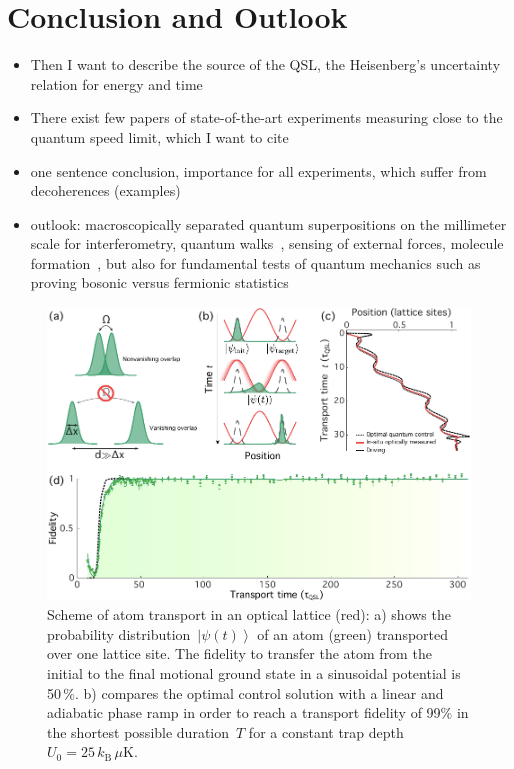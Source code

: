 \documentclass[aps,pra,reprint,a4paper,nofootinbib,superscriptaddress,numbers,longbibliography,showpacs,showkeys,floatfix]{revtex4-1}
\def\ket#1{\left|#1\right\rangle}
\begin{document}
%
%

\section*{Conclusion and Outlook}
\begin{itemize}
     \item Then I want to describe the source of the QSL, the Heisenberg's uncertainty relation for energy and time~\cite{Deffner:2017a, Anandan:1990} %
    \item There exist few papers of state-of-the-art experiments measuring close to the quantum speed limit, which I want to cite~\cite{Frank:2016, Bason:2012}
    \item one sentence conclusion, importance for all experiments, which suffer from decoherences (examples)
    \item outlook: macroscopically separated quantum superpositions on the millimeter scale for interferometry, quantum walks~\cite{Groh:2016}, sensing of external forces, molecule formation~\cite{Liu:2018}, but also for fundamental tests of quantum mechanics such as proving bosonic versus fermionic statistics~\cite{Roos:2017}
\end{itemize}

\begin{figure}
	\centering
	\includegraphics[width=\textwidth]{figure1.pdf}
	\caption[]{Scheme of atom transport in an optical lattice (red): a) shows the probability distribution~$\ket{\psi(t)}$ of an atom (green) transported over one lattice site. The fidelity to transfer the atom from the initial to the final motional ground state in a sinusoidal potential is 50$\,\%$. b) compares the optimal control solution with a linear and adiabatic phase ramp in order to reach a transport fidelity of 99$\%$ in the shortest possible duration~$T$ for a constant trap depth~$U_0 = 25\,k_{\text{B}}\, \mu$K.}
	\label{Fig:Transport_Ramp}
\end{figure}
\end{document}
